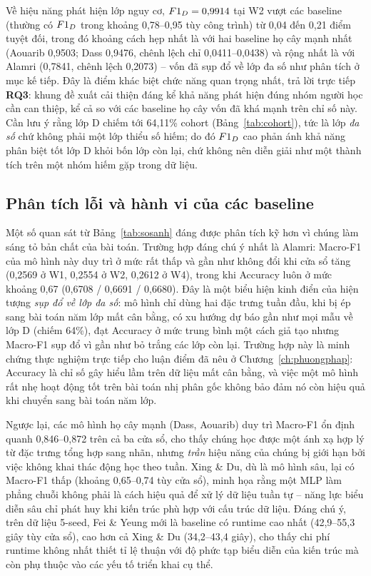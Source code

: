 Về hiệu năng phát hiện lớp nguy cơ, $F1_{D} = 0{,}9914$ tại W2 vượt các baseline (thường có $F1_{D}$ trong khoảng 0,78--0,95 tùy công trình) từ 0,04 đến 0,21 điểm tuyệt đối, trong đó khoảng cách hẹp nhất là với hai baseline họ cây mạnh nhất (Aouarib 0,9503; Dass 0,9476, chênh lệch chỉ 0,0411--0,0438) và rộng nhất là với Alamri (0,7841, chênh lệch 0,2073) -- vốn đã sụp đổ về lớp đa số như phân tích ở mục kế tiếp. Đây là điểm khác biệt chức năng quan trọng nhất, trả lời trực tiếp \textbf{RQ3}: khung đề xuất cải thiện đáng kể khả năng phát hiện đúng nhóm người học cần can thiệp, kể cả so với các baseline họ cây vốn đã khá mạnh trên chỉ số này. Cần lưu ý rằng lớp D chiếm tới 64,11\% cohort (Bảng~\ref{tab:cohort}), tức là lớp \emph{đa số} chứ không phải một lớp thiểu số hiếm; do đó $F1_{D}$ cao phản ánh khả năng phân biệt tốt lớp D khỏi bốn lớp còn lại, chứ không nên diễn giải như một thành tích trên một nhóm hiếm gặp trong dữ liệu.

\subsection{Phân tích lỗi và hành vi của các baseline}

Một số quan sát từ Bảng~\ref{tab:sosanh} đáng được phân tích kỹ hơn vì chúng làm sáng tỏ bản chất của bài toán. Trường hợp đáng chú ý nhất là Alamri: Macro-F1 của mô hình này duy trì ở mức rất thấp và gần như không đổi khi cửa sổ tăng (0,2569 ở W1, 0,2554 ở W2, 0,2612 ở W4), trong khi Accuracy luôn ở mức khoảng 0,67 (0,6708 / 0,6691 / 0,6680). Đây là một biểu hiện kinh điển của hiện tượng \emph{sụp đổ về lớp đa số}: mô hình chỉ dùng hai đặc trưng tuần đầu, khi bị ép sang bài toán năm lớp mất cân bằng, có xu hướng dự báo gần như mọi mẫu về lớp D (chiếm 64\%), đạt Accuracy ở mức trung bình một cách giả tạo nhưng Macro-F1 sụp đổ vì gần như bỏ trắng các lớp còn lại. Trường hợp này là minh chứng thực nghiệm trực tiếp cho luận điểm đã nêu ở Chương~\ref{ch:phuongphap}: Accuracy là chỉ số gây hiểu lầm trên dữ liệu mất cân bằng, và việc một mô hình rất nhẹ hoạt động tốt trên bài toán nhị phân gốc \cite{Alamri2019} không bảo đảm nó còn hiệu quả khi chuyển sang bài toán năm lớp.

Ngược lại, các mô hình họ cây mạnh (Dass, Aouarib) duy trì Macro-F1 ổn định quanh 0,846--0,872 trên cả ba cửa sổ, cho thấy chúng học được một ánh xạ hợp lý từ đặc trưng tổng hợp sang nhãn, nhưng \emph{trần} hiệu năng của chúng bị giới hạn bởi việc không khai thác động học theo tuần. Xing \& Du, dù là mô hình sâu, lại có Macro-F1 thấp (khoảng 0,65--0,74 tùy cửa sổ), minh họa rằng một MLP làm phẳng chuỗi không phải là cách hiệu quả để xử lý dữ liệu tuần tự -- năng lực biểu diễn sâu chỉ phát huy khi kiến trúc phù hợp với cấu trúc dữ liệu. Đáng chú ý, trên dữ liệu 5-seed, Fei \& Yeung mới là baseline có runtime cao nhất (42,9--55,3 giây tùy cửa sổ), cao hơn cả Xing \& Du (34,2--43,4 giây), cho thấy chi phí runtime không nhất thiết tỉ lệ thuận với độ phức tạp biểu diễn của kiến trúc mà còn phụ thuộc vào các yếu tố triển khai cụ thể.

